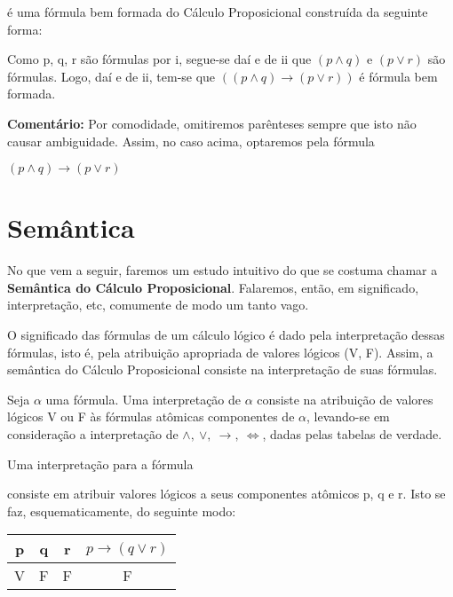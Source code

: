 \begin{exemplo}
     é uma fórmula bem formada do Cálculo Proposicional construída da seguinte forma:
\end{exemplo}

Como p, q, r  são fórmulas por i, segue-se daí e de ii que $(p \land q)$ e $(p \lor r)$ são fórmulas.
Logo, daí e de ii, tem-se que $((p \land q) \to (p \lor r))$ é fórmula bem formada.

\bigskip

\noindent \textbf{Comentário:} Por comodidade, omitiremos parênteses sempre que isto não causar ambiguidade.
Assim, no caso acima, optaremos pela fórmula


\centerline{$(p \land q) \to (p \lor r)$}

\section{Semântica}
\setcounter{exemplo}{0}
No que vem a seguir, faremos um estudo intuitivo do que se costuma chamar a \textbf{Semântica do Cálculo Proposicional}.
Falaremos, então, em significado, interpretação, etc, comumente de modo um tanto vago.

O significado das fórmulas de um cálculo lógico é dado pela interpretação dessas fórmulas, isto é, pela atribuição apropriada de valores lógicos (V, F).
Assim, a semântica do Cálculo Proposicional consiste na interpretação de suas fórmulas.

Seja $\alpha$ uma fórmula.
Uma interpretação de $\alpha$ consiste na atribuição de valores lógicos V  ou F às fórmulas atômicas componentes de $\alpha$, levando-se em consideração a interpretação de $\land,\ \lor,\ \to,\ \iff$, dadas pelas tabelas de verdade.

\begin{exemplo}
    Uma interpretação para a fórmula 
\end{exemplo}
\noindent consiste em atribuir valores lógicos a seus componentes atômicos p, q e r.
Isto se faz, esquematicamente, do seguinte modo:

\begin{center}
    \begin{tabular}{c c c c}
        p & q & r & $p \to (q \lor r)$ \\ \hline
        V & F & F & F
    \end{tabular}
\end{center}

